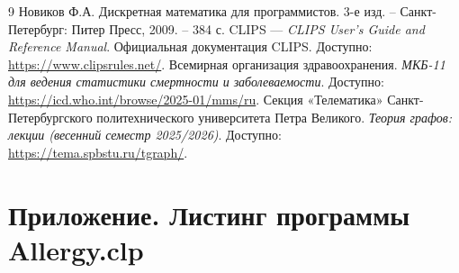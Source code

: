 \documentclass[a4paper, final]{extarticle}
\begin{document}
	\newpage
	
	\begin{thebibliography}{9}
		 Новиков Ф.А. Дискретная математика для программистов. 3-е изд. – Санкт-Петербург: Питер Пресс, 2009. – 384 с.
		 CLIPS — \textit{CLIPS User's Guide and Reference Manual}. Официальная документация CLIPS. Доступно: \url{https://www.clipsrules.net/}.
		 Всемирная организация здравоохранения. \textit{МКБ-11 для ведения статистики смертности и заболеваемости}. Доступно: \url{https://icd.who.int/browse/2025-01/mms/ru}.
		Секция «Телематика» Санкт-Петербургского политехнического университета Петра Великого. \textit{Теория графов: лекции (весенний семестр 2025/2026)}. Доступно: \url{https://tema.spbstu.ru/tgraph/}.
	\end{thebibliography}
	
	\newpage
	
	\appendix
	\section*{Приложение. Листинг программы Allergy.clp}
	
\end{document}
